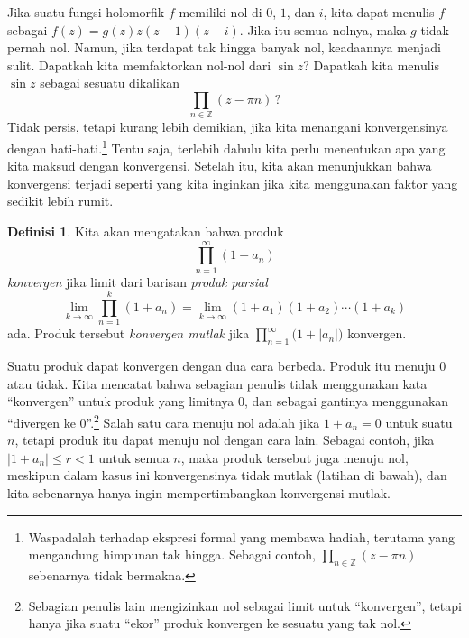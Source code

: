 \documentclass[12pt,openany]{book}
\newcommand{\sabs}[1]{\lvert {#1} \rvert}
\newcommand{\Z}{{\mathbb{Z}}}
\newcommand{\myindex}[1]{#1\index{#1}}
\newcommand{\myquote}[1]{``#1''}
\theoremstyle{plain}
\theoremstyle{remark}
\theoremstyle{definition}
\newtheorem{defn}[thm]{Definisi}
\theoremstyle{exercise}
\theoremstyle{example}
\begin{document}
Jika suatu
fungsi holomorfik $f$
memiliki nol di $0$, $1$, dan $i$, kita
dapat menulis $f$ sebagai
$f(z) = g(z) z(z-1)(z-i)$.  Jika itu semua nolnya, maka 
$g$ tidak pernah nol.  Namun, jika terdapat tak hingga banyak nol,
keadaannya menjadi sulit.
Dapatkah kita memfaktorkan nol-nol dari $\sin z$?  Dapatkah kita
menulis $\sin z$ sebagai sesuatu dikalikan
\begin{equation*}
\prod_{n \in \Z} (z-\pi n) \, ?
\end{equation*}
Tidak persis, tetapi kurang lebih demikian, jika
kita menangani konvergensinya dengan hati-hati.\footnote{Waspadalah terhadap
ekspresi formal yang membawa hadiah,
terutama yang mengandung himpunan tak hingga.
Sebagai contoh, $\prod_{n \in \Z} (z-\pi n)$ sebenarnya tidak bermakna.}
Tentu saja, terlebih dahulu kita perlu
menentukan apa yang kita maksud dengan konvergensi.  Setelah itu,
kita akan menunjukkan bahwa konvergensi terjadi seperti yang kita inginkan
jika kita menggunakan faktor yang sedikit lebih rumit.

\begin{defn}
Kita akan mengatakan bahwa produk
%
\begin{equation*}
\prod_{n=1}^\infty (1+a_n)
\end{equation*}
\emph{konvergen} jika limit dari
barisan \emph{\myindex{produk parsial}}
\begin{equation*}
\lim_{k\to \infty}
\prod_{n=1}^k (1+a_n) =
\lim_{k\to \infty}
(1+a_1)(1+a_2) \cdots (1+a_k)
\end{equation*}
ada.
Produk tersebut
\emph{konvergen mutlak}%
%
jika $\prod_{n=1}^\infty \bigl(1+\sabs{a_n}\bigr)$
konvergen.
\end{defn}

Suatu produk dapat konvergen dengan dua cara berbeda.  Produk itu menuju $0$ atau
tidak.
Kita mencatat bahwa sebagian penulis tidak menggunakan kata \myquote{konvergen} untuk produk yang
limitnya $0$, dan sebagai gantinya menggunakan
\myquote{divergen ke $0$}.\footnote{%
Sebagian penulis lain mengizinkan nol sebagai limit untuk \myquote{konvergen}, tetapi hanya jika
suatu
\myquote{ekor} produk konvergen ke sesuatu yang tak nol.}
Salah satu cara menuju nol adalah jika $1+a_n=0$ untuk suatu $n$, tetapi produk itu dapat
menuju nol dengan cara lain.  Sebagai contoh, jika $\sabs{1+a_n} \leq r < 1$ untuk semua
$n$, maka produk tersebut juga menuju nol, meskipun dalam kasus ini
konvergensinya tidak mutlak (latihan di bawah),
dan kita sebenarnya hanya ingin mempertimbangkan konvergensi mutlak.
\end{document}
